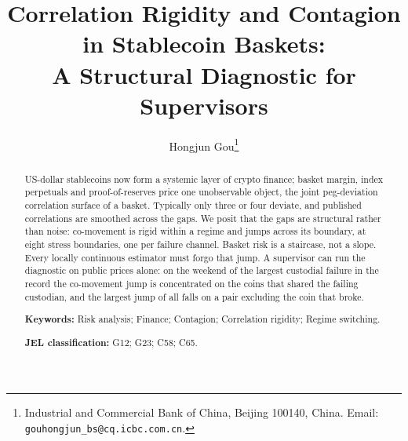 \documentclass[12pt,article]{article}
\title{\Large Correlation Rigidity and Contagion in Stablecoin Baskets:\\[2pt]
\Large A Structural Diagnostic for Supervisors}
\author{}
\author{Hongjun Gou\thanks{Industrial and Commercial Bank of China, Beijing 100140, China. Email: \texttt{gouhongjun\_bs@cq.icbc.com.cn}.}}
\date{}
\theoremstyle{definition}
\begin{document}
\maketitle

\begin{abstract}
US-dollar stablecoins now form a systemic layer of crypto finance; basket margin, index perpetuals and proof-of-reserves price one unobservable object, the joint peg-deviation correlation surface of a basket. Typically only three or four deviate, and published correlations are smoothed across the gaps. We posit that the gaps are structural rather than noise: co-movement is rigid within a regime and jumps across its boundary, at eight stress boundaries, one per failure channel. Basket risk is a staircase, not a slope. Every locally continuous estimator must forgo that jump. A supervisor can run the diagnostic on public prices alone: on the weekend of the largest custodial failure in the record the co-movement jump is concentrated on the coins that shared the failing custodian, and the largest jump of all falls on a pair excluding the coin that broke.

\medskip
\noindent\textbf{Keywords:} Risk analysis; Finance; Contagion; Correlation rigidity; Regime switching.

\medskip
\noindent\textbf{JEL classification:} G12; G23; C58; C65.
\end{abstract}







\end{document}
